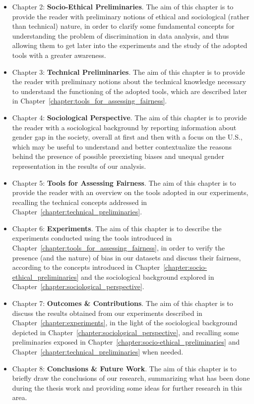 \begin{itemize}
\item Chapter 2: \textbf{Socio-Ethical Preliminaries}. The aim of this chapter is to provide the reader with preliminary notions of ethical and sociological (rather than technical) nature, in order to clarify some fundamental concepts for understanding the problem of discrimination in data analysis, and thus allowing them to get later into the experiments and the study of the adopted tools with a greater awareness.
\item Chapter 3: \textbf{Technical Preliminaries}. The aim of this chapter is to provide the reader with preliminary notions about the technical knowledge necessary to understand the functioning of the adopted tools, which are described later in Chapter~\ref{chapter:tools_for_assessing_fairness}.
\item Chapter 4: \textbf{Sociological Perspective}. The aim of this chapter is to provide the reader with a sociological background by reporting information about gender gap in the society, overall at first and then with a focus on the U.S., which may be useful to understand and better contextualize the reasons behind the presence of possible preexisting biases and unequal gender representation in the results of our analysis.
\item Chapter 5: \textbf{Tools for Assessing Fairness}. The aim of this chapter is to provide the reader with an overview on the tools adopted in our experiments, recalling the technical concepts addressed in Chapter~\ref{chapter:technical_preliminaries}.
\item Chapter 6: \textbf{Experiments}. The aim of this chapter is to describe the experiments conducted using the tools introduced in Chapter~\ref{chapter:tools_for_assessing_fairness}, in order to verify the presence (and the nature) of bias in our datasets and discuss their fairness, according to the concepts introduced in Chapter~\ref{chapter:socio-ethical_preliminaries} and the sociological background explored in Chapter~\ref{chapter:sociological_perspective}.
\item Chapter 7: \textbf{Outcomes \& Contributions}. The aim of this chapter is to discuss the results obtained from our experiments described in Chapter~\ref{chapter:experiments}, in the light of the sociological background depicted in Chapter~\ref{chapter:sociological_perspective}, and recalling some preliminaries exposed in Chapter~\ref{chapter:socio-ethical_preliminaries} and Chapter~\ref{chapter:technical_preliminaries} when needed.
\item Chapter 8: \textbf{Conclusions \& Future Work}. The aim of this chapter is to briefly draw the conclusions of our research, summarizing what has been done during the thesis work and providing some ideas for further research in this area.
\end{itemize}
